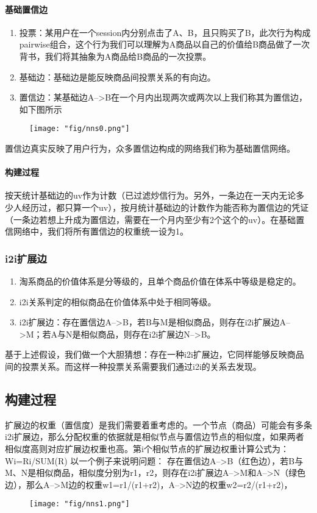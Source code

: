 \paragraph{基础置信边}
\begin{enumerate}
\item 投票：某用户在一个session内分别点击了A、B，且只购买了B，此次行为构成pairwise组合，这个行为我们可以理解为A商品以自己的价值给B商品做了一次背书，我们将其抽象为A商品给B商品的一次投票。
\item 基础边：基础边是能反映商品间投票关系的有向边。
\item 置信边：某基础边A-->B在一个月内出现两次或两次以上我们称其为置信边，如下图所示
\end{enumerate}

\begin{figure}[!h]
	\centering
	\texttt{[image: "fig/nns0.png"]}
	\caption{}
	\label{fig:nns0}
\end{figure}

置信边真实反映了用户行为，众多置信边构成的网络我们称为基础置信网络。
\paragraph{构建过程}
按天统计基础边的uv作为计数（已过滤炒信行为。另外，一条边在一天内无论多少人经历过，都只算一个uv），按月统计基础边的计数作为能否称为置信边的凭证（一条边若想上升成为置信边，需要在一个月内至少有2个这个的uv）。在基础置信网络中，我们将所有置信边的权重统一设为1。

\subsubsection{i2i扩展边}
\begin{enumerate}
\item 淘系商品的价值体系是分等级的，且单个商品价值在体系中等级是稳定的。
\item i2i关系判定的相似商品在价值体系中处于相同等级。
\item i2i扩展边：存在置信边A-->B，若B与M是相似商品，则存在i2i扩展边A-->M；若A与N是相似商品，则存在i2i扩展边N-->B。
\end{enumerate}
基于上述假设，我们做一个大胆猜想：存在一种i2i扩展边，它同样能够反映商品间的投票关系。而这样一种投票关系需要我们通过i2i的关系去发现。

\subsection{构建过程}
扩展边的权重（置信度）是我们需要着重考虑的。一个节点（商品）可能会有多条i2i扩展边，那么分配权重的依据就是相似节点与置信边节点的相似度，如果两者相似度高则对应扩展边权重也高。第i个相似节点的扩展边权重计算公式为：Wi=Ri/SUM(R)
以一个例子来说明问题：
存在置信边A-->B（红色边），若B与M、N是相似商品，相似度分别为r1，r2，则存在i2i扩展边A-->M和A-->N（绿色边），那么A-->M边的权重w1=r1/(r1+r2)，A-->N边的权重w2=r2/(r1+r2)，
\begin{figure}[!h]
	\centering
	\texttt{[image: "fig/nns1.png"]}
	\caption{}
	\label{fig:nns1}
\end{figure}

